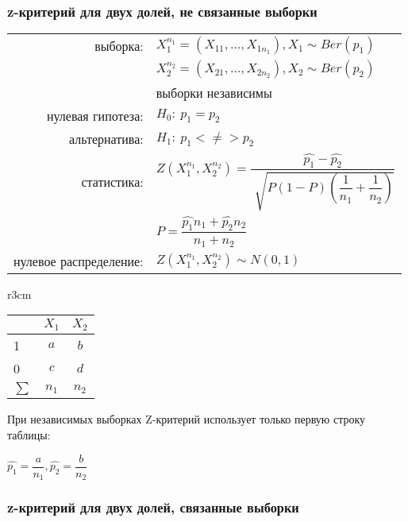 \documentclass[a4paper,12pt]{article}
\begin{document}
\subsubsection{z-критерий для двух долей, не связанные выборки}

\begin{table}[h]
	\begin{tabular}{rl}
выборка:& $ X_{1}^{n_{1}} = \left( X_{11}, \ldots, X_{1n_{1}} \right), X_{1} \sim Ber(p_{1}) $ \\
        & $ X_{2}^{n_{2}} = \left( X_{21}, \ldots, X_{2n_{2}} \right), X_{2} \sim Ber(p_{2}) $ \\
        & выборки независимы \\
нулевая гипотеза: & $ H_{0}:~p_{1} = p_{2} $ \\
альтернатива: & $ H_{1}:~p_{1} <\neq> p_{2} $ \\
статистика: & $ Z \left( X_{1}^{n_{1}},  X_{2}^{n_{2}} \right) = \dfrac{ \hat{p_{1}} - \hat{p_{2}} }{ \sqrt[]{ P(1-P)\left( \dfrac{1}{n_{1}}+\dfrac{1}{n_{2}} \right) } } $ \\
			& $ P = \dfrac{ \hat{p_{1}}n_{1} + \hat{p_{2}}n_{2} }{n_{1}+n_{2}} $ \\
нулевое распределение: & $ Z\left( X_{1}^{n_{1}},  X_{2}^{n_{2}} \right) \sim N( 0, 1) $
	\end{tabular}
\end{table}

\begin{wraptable}[1]{r}{3cm}
  \begin{tabular}{|l|c|c|}
    \hline
    & $X_{1}$ & $X_{2}$ \\
    \hline
	1 & $a$ & $b$ \\
    \hline
    0 & $c$ & $d$ \\
    \hline
    $\sum$ & $n_{1}$ & $n_{2}$ \\
    \hline
  \end{tabular}
\end{wraptable}При независимых выборках Z-критерий использует только первую строку таблицы:
\begin{center}
$ \hat{p_{1}} = \dfrac{a}{n_{1}}, \hat{p_{2}} = \dfrac{b}{n_{2}} $
\end{center}

\pagebreak

\subsubsection{z-критерий для двух долей, связанные выборки}
\end{document}
